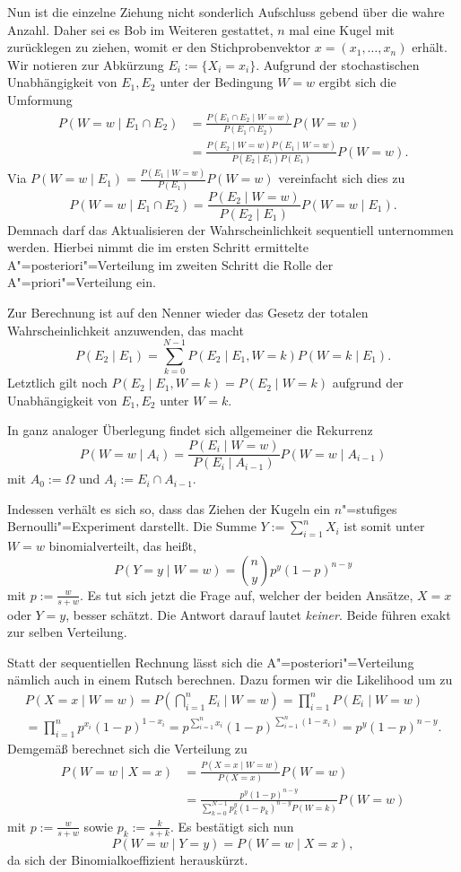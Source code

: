 Nun ist die einzelne Ziehung nicht sonderlich Aufschluss gebend über die
wahre Anzahl. Daher sei es Bob im Weiteren gestattet, $n$ mal eine
Kugel mit zurücklegen zu ziehen, womit er den Stichprobenvektor
$x=(x_1,\ldots,x_n)$ erhält. Wir notieren zur Abkürzung
$E_i:=\{X_i=x_i\}$. Aufgrund der stochastischen Unabhängigkeit von
$E_1,E_2$ unter der Bedingung $W=w$ ergibt sich die Umformung
\begin{align*}
P(W=w\mid E_1\cap E_2) &= \frac{P(E_1\cap E_2\mid W=w)}{P(E_1\cap E_2)}P(W=w)\\
&= \frac{P(E_2\mid W=w)P(E_1\mid W=w)}{P(E_2\mid E_1)P(E_1)}P(W=w).
\end{align*}
Via $P(W=w\mid E_1) = \frac{P(E_1\mid W=w)}{P(E_1)}P(W=w)$
vereinfacht sich dies zu
\[P(W=w\mid E_1\cap E_2)
= \frac{P(E_2\mid W=w)}{P(E_2\mid E_1)}P(W=w\mid E_1).\]
Demnach darf das Aktualisieren der Wahrscheinlichkeit sequentiell
unternommen werden. Hierbei nimmt die im ersten Schritt ermittelte
A"=posteriori"=Verteilung im zweiten Schritt die Rolle der
A"=priori"=Verteilung ein.

Zur Berechnung ist auf den Nenner wieder das Gesetz der totalen
Wahrscheinlichkeit anzuwenden, das macht
\[P(E_2\mid E_1) = \sum_{k=0}^{N-1}P(E_2\mid E_1,W=k)P(W=k\mid E_1).\]
Letztlich gilt noch $P(E_2\mid E_1,W=k)=P(E_2\mid W=k)$ aufgrund der
Unabhängigkeit von $E_1,E_2$ unter $W=k$.

In ganz analoger Überlegung findet sich allgemeiner die Rekurrenz
\[P(W=w\mid A_i) = \frac{P(E_i\mid W=w)}{P(E_i\mid A_{i-1})}P(W=w\mid A_{i-1})\]
mit $A_0:=\Omega$ und $A_i := E_i\cap A_{i-1}$.

Indessen verhält es sich so, dass das Ziehen der Kugeln ein $n$"=stufiges
Bernoulli"=Experiment darstellt. Die Summe $Y:=\sum_{i=1}^n X_i$ ist
somit unter $W=w$ binomialverteilt, das heißt,
\[P(Y=y\mid W=w) = \binom{n}{y}p^y(1-p)^{n-y}\]
mit $p:=\frac{w}{s+w}$. Es tut sich jetzt die Frage auf, welcher der
beiden Ansätze, $X=x$ oder $Y=y$, besser schätzt. Die Antwort darauf
lautet \emph{keiner}. Beide führen exakt zur selben Verteilung.

Statt der sequentiellen Rechnung lässt sich die A"=posteriori"=Verteilung
nämlich auch in einem Rutsch berechnen. Dazu formen wir die
Likelihood um zu
\begin{gather*}
\textstyle P(X=x\mid W=w) = P(\bigcap_{i=1}^n E_i\mid W=w)
= \prod_{i=1}^n P(E_i\mid W=w)\\
= \textstyle\prod_{i=1}^n p^{x_i}(1-p)^{1-x_i}
= p^{\sum_{i=1}^n x_i}(1-p)^{\sum_{i=1}^n (1-x_i)}
= p^y (1-p)^{n-y}.
\end{gather*}
Demgemäß berechnet sich die Verteilung zu
\begin{align*}
P(W=w\mid X=x) &= \frac{P(X=x\mid W=w)}{P(X=x)}P(W=w)\\
&= \frac{p^y (1-p)^{n-y}}{\sum_{k=0}^{N-1} p_k^y (1-p_k)^{n-y}P(W=k)}P(W=w)
\end{align*}
mit $p:=\frac{w}{s+w}$ sowie $p_k:=\frac{k}{s+k}$. Es bestätigt sich nun
\[P(W=w\mid Y=y) = P(W=w\mid X=x),\]
da sich der Binomialkoeffizient herauskürzt.

